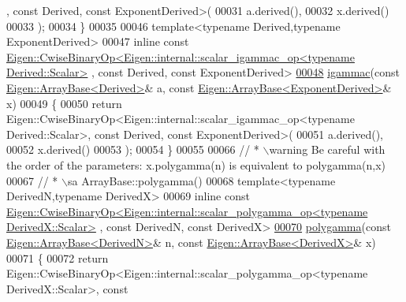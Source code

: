 \begin{DoxyCode}
      , \textcolor{keyword}{const} Derived, \textcolor{keyword}{const} ExponentDerived>(
00031     a.derived(),
00032     x.derived()
00033   );
00034 \}
00035 
00046 \textcolor{keyword}{template}<\textcolor{keyword}{typename} Derived,\textcolor{keyword}{typename} ExponentDerived>
00047 \textcolor{keyword}{inline} \textcolor{keyword}{const} 
      \hyperlink{group___core___module_class_eigen_1_1_cwise_binary_op}{Eigen::CwiseBinaryOp<Eigen::internal::scalar\_igammac\_op<typename Derived::Scalar>}
      , \textcolor{keyword}{const} Derived, \textcolor{keyword}{const} ExponentDerived>
\hyperlink{namespace_eigen_a1abaa2ff8c7b1871eaf026a47c6bbf3b}{00048} \hyperlink{namespace_eigen_a1abaa2ff8c7b1871eaf026a47c6bbf3b}{igammac}(\textcolor{keyword}{const} \hyperlink{group___core___module_class_eigen_1_1_array_base}{Eigen::ArrayBase<Derived>}& a, \textcolor{keyword}{const} 
      \hyperlink{group___core___module_class_eigen_1_1_array_base}{Eigen::ArrayBase<ExponentDerived>}& x)
00049 \{
00050   \textcolor{keywordflow}{return} Eigen::CwiseBinaryOp<Eigen::internal::scalar\_igammac\_op<typename Derived::Scalar>, \textcolor{keyword}{const} Derived, \textcolor{keyword}{
      const} ExponentDerived>(
00051     a.derived(),
00052     x.derived()
00053   );
00054 \}
00055 
00066 \textcolor{comment}{// * \(\backslash\)warning Be careful with the order of the parameters: x.polygamma(n) is equivalent to polygamma(n,x)}
00067 \textcolor{comment}{// * \(\backslash\)sa ArrayBase::polygamma()}
00068 \textcolor{keyword}{template}<\textcolor{keyword}{typename} DerivedN,\textcolor{keyword}{typename} DerivedX>
00069 \textcolor{keyword}{inline} \textcolor{keyword}{const} 
      \hyperlink{group___core___module_class_eigen_1_1_cwise_binary_op}{Eigen::CwiseBinaryOp<Eigen::internal::scalar\_polygamma\_op<typename DerivedX::Scalar>}
      , \textcolor{keyword}{const} DerivedN, \textcolor{keyword}{const} DerivedX>
\hyperlink{namespace_eigen_ae3b47a13a0699f5dbaa0623c11333dca}{00070} \hyperlink{namespace_eigen_ae3b47a13a0699f5dbaa0623c11333dca}{polygamma}(\textcolor{keyword}{const} \hyperlink{group___core___module_class_eigen_1_1_array_base}{Eigen::ArrayBase<DerivedN>}& n, \textcolor{keyword}{const} 
      \hyperlink{group___core___module_class_eigen_1_1_array_base}{Eigen::ArrayBase<DerivedX>}& x)
00071 \{
00072   \textcolor{keywordflow}{return} Eigen::CwiseBinaryOp<Eigen::internal::scalar\_polygamma\_op<typename DerivedX::Scalar>, \textcolor{keyword}{const} 

\end{DoxyCode}
